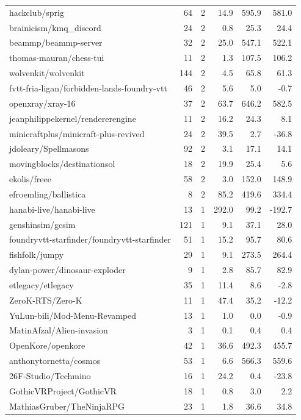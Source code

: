\begin{center}
{\begin{longtable}{@{}lrrrrr@{}}
hackclub/sprig & 64 & 2 & 14.9 & 595.9 & 581.0 \\
brainicism/kmq\_discord & 24 & 2 & 0.8 & 25.3 & 24.4 \\
beammp/beammp-server & 32 & 2 & 25.0 & 547.1 & 522.1 \\
thomas-mauran/chess-tui & 11 & 2 & 1.3 & 107.5 & 106.2 \\
wolvenkit/wolvenkit & 144 & 2 & 4.5 & 65.8 & 61.3 \\
fvtt-fria-ligan/forbidden-lands-foundry-vtt & 46 & 2 & 5.6 & 5.0 & -0.7 \\
openxray/xray-16 & 37 & 2 & 63.7 & 646.2 & 582.5 \\
jeanphilippekernel/rendererengine & 11 & 2 & 16.2 & 24.3 & 8.1 \\
minicraftplus/minicraft-plus-revived & 24 & 2 & 39.5 & 2.7 & -36.8 \\
jdoleary/Spellmasons & 92 & 2 & 3.1 & 17.1 & 14.1 \\
movingblocks/destinationsol & 18 & 2 & 19.9 & 25.4 & 5.6 \\
ekolis/freee & 58 & 2 & 3.0 & 152.0 & 148.9 \\
efroemling/ballistica & 8 & 2 & 85.2 & 419.6 & 334.4 \\
hanabi-live/hanabi-live & 13 & 1 & 292.0 & 99.2 & -192.7 \\
genshinsim/gcsim & 121 & 1 & 9.1 & 37.1 & 28.0 \\
foundryvtt-starfinder/foundryvtt-starfinder & 51 & 1 & 15.2 & 95.7 & 80.6 \\
fishfolk/jumpy & 29 & 1 & 9.1 & 273.5 & 264.4 \\
dylan-power/dinosaur-exploder & 9 & 1 & 2.8 & 85.7 & 82.9 \\
etlegacy/etlegacy & 35 & 1 & 11.4 & 8.6 & -2.8 \\
ZeroK-RTS/Zero-K & 11 & 1 & 47.4 & 35.2 & -12.2 \\
YuLun-bili/Mod-Menu-Revamped & 13 & 1 & 1.0 & 0.0 & -0.9 \\
MatinAfzal/Alien-invasion & 3 & 1 & 0.1 & 0.4 & 0.4 \\
OpenKore/openkore & 42 & 1 & 36.6 & 492.3 & 455.7 \\
anthonytornetta/cosmos & 53 & 1 & 6.6 & 566.3 & 559.6 \\
26F-Studio/Techmino & 16 & 1 & 24.2 & 0.4 & -23.8 \\
GothicVRProject/GothicVR & 18 & 1 & 0.8 & 3.0 & 2.2 \\
MathiasGruber/TheNinjaRPG & 23 & 1 & 1.8 & 36.6 & 34.8 \\

\end{longtable}}
\end{center}
